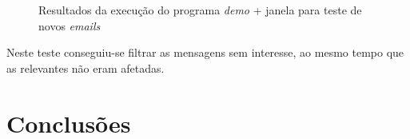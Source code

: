 \documentclass[a4paper,11pt,openright,oneside]{report}
\begin{document}
\begin{figure}[ht]	
\center
{}
\caption{Resultados da execução do programa \textit{demo} + janela para teste de novos \textit{emails}}
\label{fig:poc1}
\end{figure}

Neste teste conseguiu-se filtrar as mensagens sem interesse, ao mesmo tempo que as relevantes não eram afetadas.

\chapter{Conclusões}
\label{chap.conclusões}

\maketitle
\nocite{*}
\printbibliography[title={Referências}]
\end{document}
